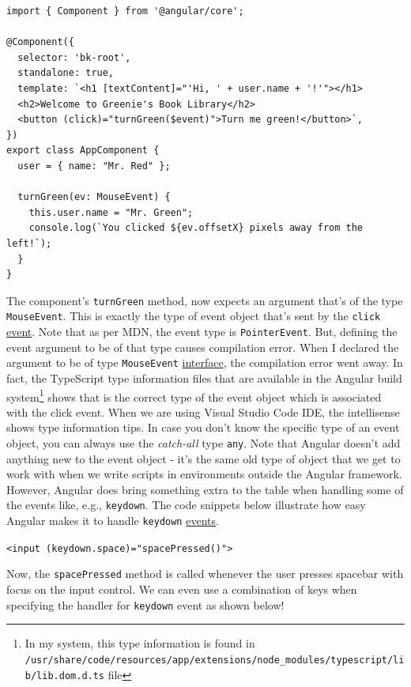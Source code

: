 \documentclass{report}
\begin{document}
\begin{Verbatim}[label=2.1.5]
import { Component } from '@angular/core';

@Component({
  selector: 'bk-root',
  standalone: true,
  template: `<h1 [textContent]="'Hi, ' + user.name + '!'"></h1>
  <h2>Welcome to Greenie's Book Library</h2>
  <button (click)="turnGreen($event)">Turn me green!</button>`,
})
export class AppComponent {
  user = { name: "Mr. Red" };

  turnGreen(ev: MouseEvent) {
    this.user.name = "Mr. Green";
    console.log(`You clicked ${ev.offsetX} pixels away from the left!`);
  }
}
\end{Verbatim}

The component's \verb|turnGreen| method, now expects an argument that's of the type \verb|MouseEvent|. This is exactly the type of event object that's sent by the \verb|click| \href{https://developer.mozilla.org/en-US/docs/Web/API/Element/click_event}{event}. Note that as per MDN, the event type is \verb|PointerEvent|. But, defining the event argument to be of that type causes compilation error. When I declared the argument to be of type \verb|MouseEvent| \href{https://developer.mozilla.org/en-US/docs/Web/API/MouseEvent}{interface}, the compilation error went away. In fact, the TypeScript type information files that are available in the Angular build system\footnote{In my system, this type information is found in \texttt{/usr/share/code/resources/app/extensions/node\_modules/typescript/lib/lib.dom.d.ts} file} shows that is the correct type of the event object which is associated with the click event. When we are using Visual Studio Code IDE, the intellisense shows type information tips. In case you don't know the specific type of an event object, you can always use the \textsl{catch-all} type \verb|any|. Note that Angular doesn't add anything new to the event object - it's the same old type of object that we get to work with when we write scripts in environments outside the Angular framework. However, Angular does bring something extra to the table when handling some of the events like, e.g., \verb|keydown|. The code snippets below illustrate how easy Angular makes it to handle \verb|keydown| \href{https://developer.mozilla.org/en-US/docs/Web/API/Element/keydown_event}{events}.

\verb|<input (keydown.space)="spacePressed()">|

Now, the \verb|spacePressed| method is called whenever the user presses spacebar with focus on the input control. We can even use a combination of keys when specifying the handler for \verb|keydown| event as shown below!
\end{document}

